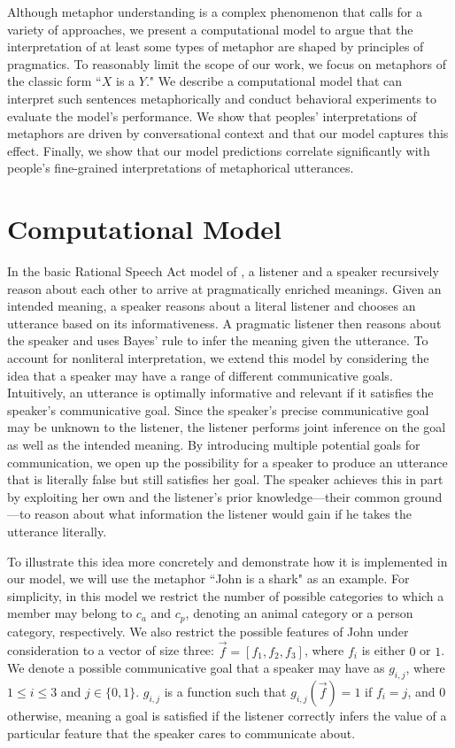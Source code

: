 \documentclass[10pt,letterpaper]{article}
\begin{document}
Although metaphor understanding is a complex phenomenon that calls for a variety of approaches, we present a computational model to argue that the interpretation of at least some types of metaphor are shaped by principles of pragmatics. To reasonably limit the scope of our work, we focus on metaphors of the classic form ``$X$ is a $Y$." We describe a computational model that can interpret such sentences metaphorically and conduct behavioral experiments to evaluate the model's performance. We show that peoples' interpretations of metaphors are driven by conversational context and that our model captures this effect. Finally, we show that our model predictions correlate significantly with people's fine-grained interpretations of metaphorical utterances.

\section{Computational Model}
In the basic Rational Speech Act model of \cite{frank2012predicting}, a listener and a speaker recursively reason about each other to arrive at pragmatically enriched meanings. Given an intended meaning, a speaker reasons about a literal listener and chooses an utterance based on its informativeness. A pragmatic listener then reasons about the speaker and uses Bayes' rule to infer the meaning given the utterance. To account for nonliteral interpretation, we extend this model by considering the idea that a speaker may have a range of different communicative goals. Intuitively, an utterance is optimally informative and relevant if it satisfies the speaker's communicative goal. Since the speaker's precise communicative goal may be unknown to the listener, the listener performs joint inference on the goal as well as the intended meaning. By introducing multiple potential goals for communication, we open up the possibility for a speaker to produce an utterance that is literally false but still satisfies her goal. The speaker achieves this in part by exploiting her own and the listener's prior knowledge---their common ground \cite{clark1996using}---to reason about what information the listener would gain if he takes the utterance literally. 

To illustrate this idea more concretely and demonstrate how it is implemented in our model, we will use the metaphor ``John is a shark" as an example. For simplicity, in this model we restrict the number of possible categories to which a member may belong to $c_a$ and $c_p$, denoting an animal category or a person category, respectively. We also restrict the possible features of John under consideration to a vector of size three: $\vec f = [f_1, f_2, f_3]$, where $f_i$ is either $0$ or $1$. We denote a possible communicative goal that a speaker may have as $g_{i,j}$, where $1 \leq i \leq 3$ and $j \in \{0,1\}$. $g_{i,j}$ is a function such that $g_{i,j} (\vec f) = 1$ if $f_i = j$, and $0$ otherwise, meaning a goal is satisfied if the listener correctly infers the value of a particular feature that the speaker cares to communicate about. 
\end{document}
